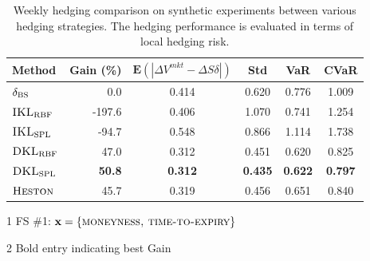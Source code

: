 \documentclass[letterpaper,12pt,titlepage,oneside,final]{book}
\numberwithin{equation}{section}
\theoremstyle{definition}
\newcommand{\vx}{\mathbf{x}}
\newcommand{\E}{\mathbf{E}}
\newcommand{\DS}{\Delta S}
\newcommand{\Heston}{\textsc{Heston}}
\newcommand{\DVmkt}{\Delta V^{mkt}}
\newcommand{\MeanAbs}{\E(|\DVmkt-\DS \delta |)}
\newcommand{\DKLs}{\bf\textsc{DKL}_{\text{SPL}}}
\newcommand{\DKLg}{\bf\textsc{DKL}_{\text{RBF}}}
\newcommand{\IKLs}{\bf\textsc{IKL}_{\text{SPL}}}
\newcommand{\IKLg}{\bf\textsc{IKL}_{\text{RBF}}}
\newcommand{\Del}{\delta_{\textsc{BS}}}
\begin{document}
\begin{table}[htp!]
\begin{center}
\begin{threeparttable}
\begin{tabular}{|l|r c c c c|}
\hline
Method & Gain (\%) & $\MeanAbs$ & Std& VaR & CVaR   \\ \hline
$\Del$ & 0.0 & 0.414 & 0.620 & 0.776 & 1.009 \\
$\IKLg$  & -197.6 & 0.406 & 1.070 & 0.741 & 1.254 \\
$\IKLs$  & -94.7 & 0.548 & 0.866 & 1.114 & 1.738 \\
$\DKLg$  & 47.0 & 0.312 & 0.451 & 0.620 & 0.825 \\
$\DKLs$  & \textbf{50.8} & \textbf{0.312} & \textbf{0.435} & \textbf{0.622} & \textbf{0.797} \\
$\Heston$ & 45.7 & 0.319 & 0.456 & 0.651 & 0.840 \\
\hline
\end{tabular}
\caption{Weekly hedging comparison on synthetic experiments between various hedging strategies. The hedging performance is evaluated in terms of local hedging risk.}
\label{Weekly}
 \begin{tablenotes}
    \small
  \item[1] FS \#1: $\vx=\{\textsc{moneyness,~time-to-expiry}\}$
  \item[2] Bold entry indicating best Gain
  \end{tablenotes}
  \end{threeparttable}
\end{center}
\end{table}
\end{document}
